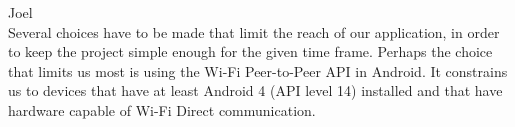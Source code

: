 Joel\\
Several choices have to be made that limit the reach of our application, in order to keep the project simple enough for the given time frame. Perhaps the choice that limits us most is using the Wi-Fi Peer-to-Peer API in Android. It constrains us to devices that have at least Android 4 (API level 14) installed and that have hardware capable of Wi-Fi Direct communication.\cite{APIGuides}
